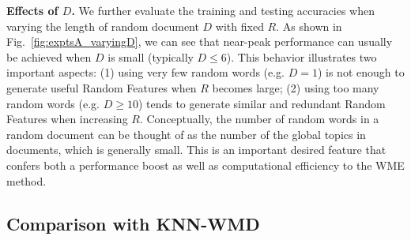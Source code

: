 \documentclass[11pt,a4paper]{article}
\newcommand{\1}{\boldsymbol{1}}
\begin{document}
\vskip0.05in
\noindent
\textbf{Effects of $D$.} We further evaluate the training and testing accuracies when varying the length of random document $D$ with fixed $R$. As shown in Fig.~\ref{fig:exptsA_varyingD}, we can see that  near-peak performance can usually be achieved when $D$ is small (typically $D \leq 6$). This behavior illustrates two important aspects: (1) using very few random words (e.g. $D=1$) is not enough to generate useful Random Features when $R$ becomes large; (2) using too many random words (e.g. $D \geq 10$) tends to generate similar and redundant Random Features when increasing $R$. Conceptually, the number of random words in a random document can be thought of as the number of the global topics in documents, which is generally small. This is an important desired feature that confers both a performance boost as well as computational efficiency to the WME method. 


\subsection{Comparison with KNN-WMD}
\label{sec:Comparisons against KNN-WMD in both accuracy and runtime}
\end{document}
